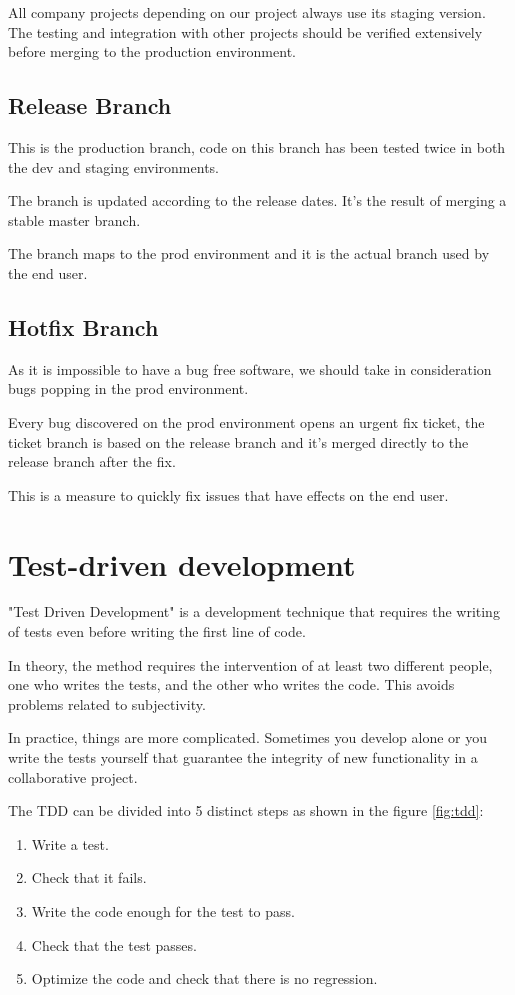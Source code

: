 \begin{spacing}{1.2}
All company projects depending on our project always use its staging version. The testing and integration with other projects should be verified extensively before merging to the production environment.

\subsection{Release Branch}
This is the production branch, code on this branch has been tested twice in both the dev and staging environments.

The branch is updated according to the release dates. It's the result of merging a stable master branch.

The branch maps to the prod environment and it is the actual branch used by the end user.
\subsection{Hotfix Branch}
As it is impossible to have a bug free software, we should take in consideration bugs popping in the prod environment.

Every bug discovered on the prod environment opens an urgent fix ticket, the ticket branch is based on the release branch and it's merged directly to the release branch after the fix.

This is a measure to quickly fix issues that have effects on the end user.




\section{Test-driven development}
"Test Driven Development" \cite{TDD} is a development technique that requires the writing of tests even before writing the first line of code.

In theory, the method requires the intervention of at least two different people, one who writes the tests, and the other who writes the code. This avoids problems related to subjectivity.

In practice, things are more complicated. Sometimes you develop alone or you write the tests yourself that guarantee the integrity of new functionality in a collaborative project.

The TDD can be divided into 5 distinct steps as shown in the figure  \ref{fig:tdd}:
\begin{enumerate}
	\item  Write a test.
	\item Check that it fails.
	\item Write the code enough for the test to pass.
	\item Check that the test passes.
	\item Optimize the code and check that there is no regression.
\end{enumerate}


\end{spacing}
